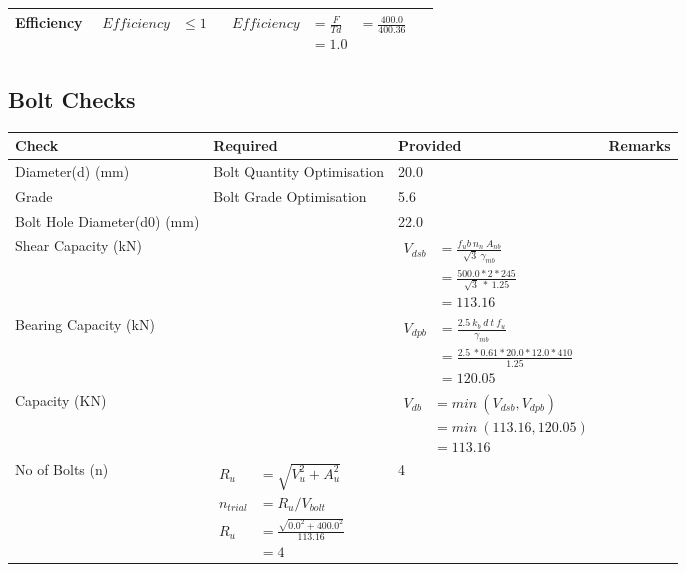 \documentclass{article}%
\renewcommand{\arraystretch}{1.2}%
\begin{document}
\begin{longtable}{|p{3cm}|p{5cm}|p{7cm}|p{1cm}|}
\hline%
Efficiency&$\begin{aligned} Efficiency &\leq 1 \end{aligned}$&$\begin{aligned} Efficiency &= \frac{F}{Td}&=\frac{400.0}{400.36}\\ &= 1.0\end{aligned}$&\\%
\hline%
\end{longtable}

%
\newpage%
\subsection{Bolt Checks}%
\label{subsec:BoltChecks}%
\renewcommand{\arraystretch}{1.2}%
\begin{longtable}{|p{3cm}|p{5cm}|p{7cm}|p{1cm}|}%
\hline%
\rowcolor{OsdagGreen}%
Check&Required&Provided&Remarks\\%
\hline%
\endhead%
\hline%
Diameter(d) (mm)&Bolt Quantity Optimisation&20.0&\\%
\hline%
Grade&Bolt Grade Optimisation&5.6&\\%
\hline%
Bolt Hole Diameter(d0) (mm)& &22.0&\\%
\hline%
Shear Capacity (kN)&&$\begin{aligned}V_{dsb} &= \frac{f_ub ~n_n~ A_{nb}}{\sqrt{3} ~\gamma_{mb}}\\ &= \frac{500.0*2*245}{\sqrt{3}~*~1.25}\\ &= 113.16\end{aligned}$&\\%
\hline%
Bearing Capacity (kN)&&$\begin{aligned}V_{dpb} &= \frac{2.5~ k_b~ d~ t~ f_u}{\gamma_{mb}}\\ &= \frac{2.5~*0.61*20.0*12.0*410}{1.25}\\ &=120.05\end{aligned}$&\\%
\hline%
Capacity (KN)&&$\begin{aligned}V_{db} &= min~ (V_{dsb}, V_{dpb})\\ &= min~ (113.16,120.05)\\ &=113.16\end{aligned}$&\\%
\hline%
No of Bolts (n)&$\begin{aligned}R_{u} &= \sqrt{V_u^2+A_u^2}\\ n_{trial} &= R_u/ V_{bolt}\\ R_{u} &= \frac{\sqrt{0.0^2+400.0^2}}{113.16}\\ &=4\end{aligned}$&4&\\%

\end{longtable}
\end{document}
